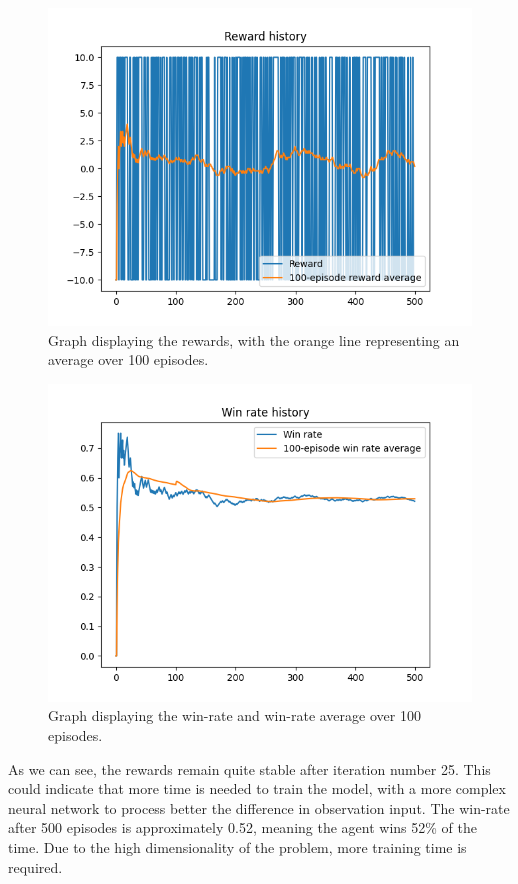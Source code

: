 \documentclass[12pt]{article}
\begin{document}
\begin{figure}[H]
    \centering
    \includegraphics[scale=0.7]{reward2.png}
    \caption{Graph displaying the rewards, with the orange line representing an average over 100 episodes.}
   
\end{figure}

\begin{figure}[H]
    \centering
    \includegraphics[scale=0.7]{win rate-hist.png}
    \caption{Graph displaying the win-rate and win-rate average over 100 episodes.}
   
\end{figure}
As we can see, the rewards remain quite stable after iteration number 25. This could indicate that more time is needed to train the model, with a more complex neural network to process better the difference in observation input. The win-rate after 500 episodes is approximately 0.52, meaning the agent wins 52\% of the time. Due to the high dimensionality of the problem, more training time is required.
\end{document}
